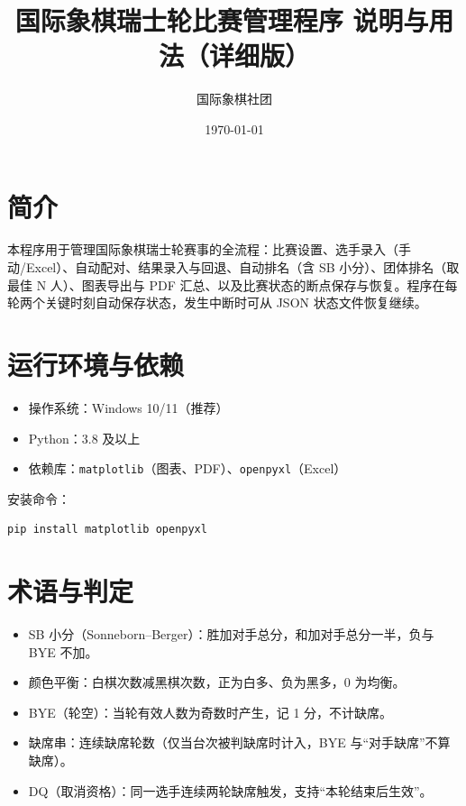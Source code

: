 \documentclass[12pt]{ctexart}
\title{国际象棋瑞士轮比赛管理程序 说明与用法（详细版）}
\author{国际象棋社团}
\date{\today}
\begin{document}
\maketitle
\tableofcontents

\section{简介}
本程序用于管理国际象棋瑞士轮赛事的全流程：比赛设置、选手录入（手动/Excel）、自动配对、结果录入与回退、自动排名（含 SB 小分）、团体排名（取最佳 N 人）、图表导出与 PDF 汇总、以及比赛状态的断点保存与恢复。程序在每轮两个关键时刻自动保存状态，发生中断时可从 JSON 状态文件恢复继续。

\section{运行环境与依赖}
\begin{itemize}[leftmargin=1.6em]
  \item 操作系统：Windows 10/11（推荐）
  \item Python：3.8 及以上
  \item 依赖库：\texttt{matplotlib}（图表、PDF）、\texttt{openpyxl}（Excel）
\end{itemize}
安装命令：
\begin{lstlisting}[language=bash]
pip install matplotlib openpyxl
\end{lstlisting}

\section{术语与判定}
\begin{itemize}[leftmargin=1.6em]
  \item SB 小分（Sonneborn–Berger）：胜加对手总分，和加对手总分一半，负与 BYE 不加。
  \item 颜色平衡：白棋次数减黑棋次数，正为白多、负为黑多，0 为均衡。
  \item BYE（轮空）：当轮有效人数为奇数时产生，记 1 分，不计缺席。
  \item 缺席串：连续缺席轮数（仅当台次被判缺席时计入，BYE 与“对手缺席”不算缺席）。
  \item DQ（取消资格）：同一选手连续两轮缺席触发，支持“本轮结束后生效”。
\end{itemize}
\end{document}
